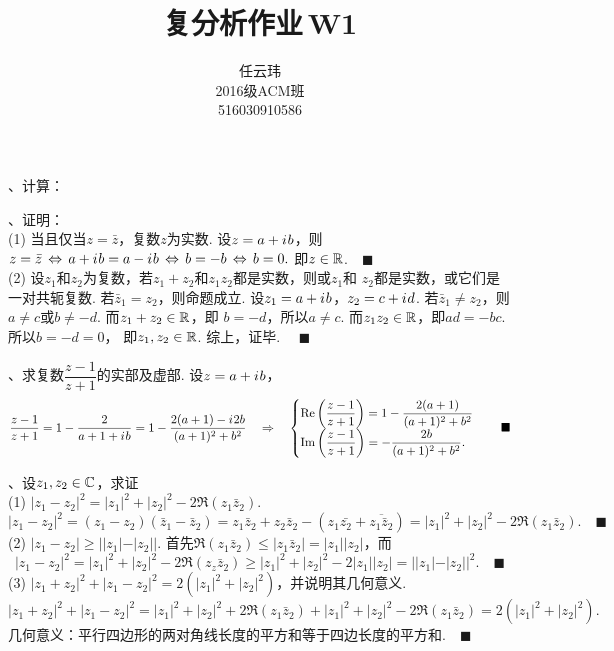 

\title{复分析作业$\,$W1}
\author{\small 任云玮\\\small2016级ACM班\\\small516030910586}
\date{}


\maketitle

、计算：

\vspace{1cm}
\par{}、证明：\\
(1) 当且仅当$z=\bar{z}$，复数$z$为实数.
\proof
  设$z=a+{i\mkern1mu} b$，则
  $
    z=\bar{z}\,\Leftrightarrow\, a+{i\mkern1mu} b = a-{i\mkern1mu} b
    \,\Leftrightarrow\, b = -b \,\Leftrightarrow\, b = 0.
  $
  即$z\in\mathbb{R}$.$\quad\blacksquare$ \\
(2) 设$z_1$和$z_2$为复数，若$z_1+z_2$和$z_1z_2$都是实数，则或$z_1$和
    $z_2$都是实数，或它们是一对共轭复数.
\proof
  若$\bar{z}_1=z_2$，则命题成立. 设$z_1=a+{i\mkern1mu} b$，$z_2=c+{i\mkern1mu} d$.
  若$\bar{z}_1\ne z_2$，则$a\ne c$或$b\ne -d$. 而$z_1+z_2\in\mathbb{R}$，即
  $b = -d$，所以$a\ne c$. 而$z_1z_2\in\mathbb{R}$，即$ad=-bc$. 所以$b=-d=0$，
  即$z_1,z_2\in\mathbb{R}$. 综上，证毕. $\quad\blacksquare$

\vspace{1cm}
\par{}、求复数$\dfrac{z-1}{z+1}$的实部及虚部.
\ans
  设$z=a+{i\mkern1mu} b$，
  \[
    \frac{z-1}{z+1} = 1 - \frac{2}{a+1+{i\mkern1mu} b} =
    1 - \frac{2(a+1) - {i\mkern1mu} 2b}{(a+1)^2 + b^2} \quad\Rightarrow\quad
    \begin{cases}
      \operatorname{Re}\left(\dfrac{z-1}{z+1}\right) = 1-\dfrac{2(a+1)}{(a+1)^2+b^2}\\
      \operatorname{Im}\left(\dfrac{z-1}{z+1}\right) = -\dfrac{2b}{(a+1)^2+b^2}.
    \end{cases}\quad\blacksquare
  \]


\vspace{1cm}
\par{}、设$z_1,z_2\in\mathbb{C}$，求证\\
(1) $|z_1-z_2|^2=|z_1|^2+|z_2|^2-2\Re(z_1\bar{z}_2)$.
\proof
  $
    |z_1-z_2|^2 = (z_1-z_2)(\bar{z}_1-\bar{z}_2) =
    z_1\bar{z}_2 + z_2\bar{z}_2 - (z_1\bar{z_2} + \overline{z_1\bar{z}_2})
    = |z_1|^2 + |z_2|^2 - 2\Re(z_1\bar{z}_2).\quad\blacksquare
  $
(2) $|z_1-z_2| \ge ||z_1| - |z_2||$.
\proof
  首先$\Re(z_1\bar{z}_2) \le |z_1\bar{z}_2| = |z_1||z_2|$，而
  \[
    |z_1-z_2|^2 = |z_1|^2 + |z_2|^2 - 2\Re(z_z\bar{z}_2)
    \ge |z_1|^2 + |z_2|^2 - 2|z_1||z_2| = ||z_1|-|z_2||^2.
    \quad\blacksquare
  \]
(3) $|z_1+z_2|^2 + |z_1-z_2|^2 = 2(|z_1|^2 + |z_2|^2)$，并说明其几何意义.
\proof
  \[
    |z_1+z_2|^2 + |z_1-z_2|^2 = |z_1|^2+|z_2|^2 + 2\Re(z_1\bar{z}_2)
    + |z_1|^2+|z_2|^2 - 2\Re(z_1\bar{z}_2) = 2(|z_1|^2+|z_2|^2).
  \]
  几何意义：平行四边形的两对角线长度的平方和等于四边长度的平方和.$\quad\blacksquare$

